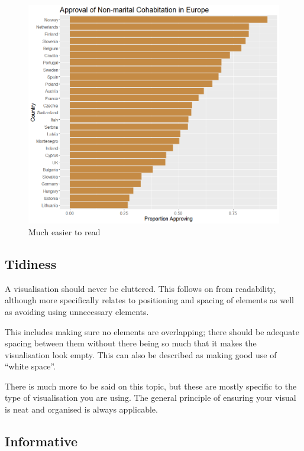 \documentclass[
]{book}
\begin{document}
\begin{figure}
\centering
\includegraphics{img/order restored.png}
\caption{Much easier to read}
\end{figure}

\hypertarget{tidiness}{%
\subsection{Tidiness}\label{tidiness}}

A visualisation should never be cluttered. This follows on from readability, although more specifically relates to positioning and spacing of elements as well as avoiding using unnecessary elements.

This includes making sure no elements are overlapping; there should be adequate spacing between them without there being so much that it makes the visualisation look empty. This can also be described as making good use of ``white space''.

There is much more to be said on this topic, but these are mostly specific to the type of visualisation you are using. The general principle of ensuring your visual is neat and organised is always applicable.

\hypertarget{informative}{%
\subsection{Informative}\label{informative}}
\end{document}
